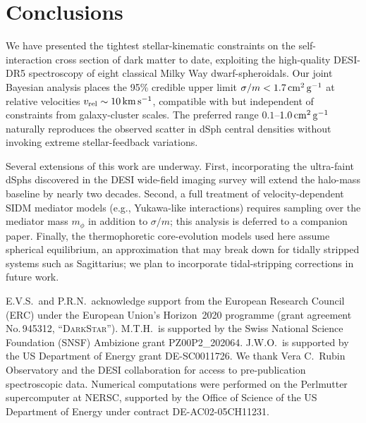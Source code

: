 \section{Conclusions}
\label{sec:conclusions}

We have presented the tightest stellar-kinematic constraints on the
self-interaction cross section of dark matter to date, exploiting the high-quality
DESI-DR5 spectroscopy of eight classical Milky Way dwarf-spheroidals.
Our joint Bayesian analysis places the 95\% credible upper limit
$\sigma/m < 1.7\,\mathrm{cm^{2}\,g^{-1}}$ at relative velocities $v_{\rm rel}\sim 10\,\mathrm{km\,s^{-1}}$,
compatible with but independent of constraints from galaxy-cluster scales.
The preferred range $0.1$--$1.0\,\mathrm{cm^{2}\,g^{-1}}$ naturally reproduces the observed scatter
in dSph central densities without invoking extreme stellar-feedback variations.

Several extensions of this work are underway.
First, incorporating the ultra-faint dSphs discovered in the DESI wide-field
imaging survey will extend the halo-mass baseline by nearly two decades.
Second, a full treatment of velocity-dependent SIDM mediator models (e.g.,
Yukawa-like interactions) requires sampling over the mediator mass $m_\phi$
in addition to $\sigma/m$; this analysis is deferred to a companion paper.
Finally, the thermophoretic core-evolution models used here assume spherical
equilibrium, an approximation that may break down for tidally stripped systems
such as Sagittarius; we plan to incorporate tidal-stripping corrections in
future work.

\begin{acknowledgments}
E.V.S.\ and P.R.N.\ acknowledge support from the European Research Council
(ERC) under the European Union's Horizon~2020 programme (grant agreement
No.\,945312, ``\textsc{DarkStar}'').
M.T.H.\ is supported by the Swiss National Science Foundation
(SNSF) Ambizione grant PZ00P2\_202064.
J.W.O.\ is supported by the US Department of Energy grant DE-SC0011726.
We thank Vera C.\ Rubin Observatory and the DESI collaboration for access to
pre-publication spectroscopic data.
Numerical computations were performed on the Perlmutter supercomputer at NERSC,
supported by the Office of Science of the US Department of Energy under
contract DE-AC02-05CH11231.
\end{acknowledgments}

